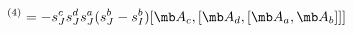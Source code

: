 \begin{equation}
[L_3^3L_2]^{(4)}=-s_{J}^{c} s_{J}^{d}  s_{J}^{a} (s_{J}^{b}-s_I^b) [{\mb A}_c,[{\mb A}_d,[{\mb A}_a,{\mb A}_b]]]
\end{equation}

